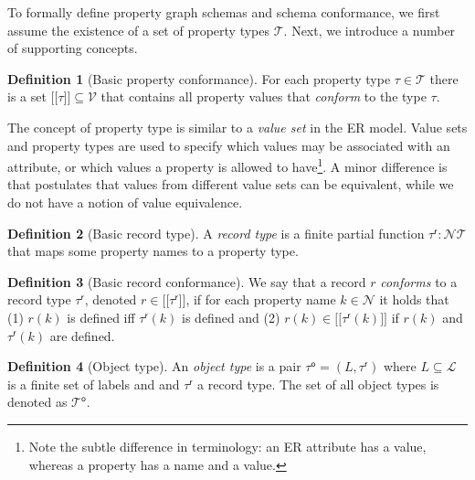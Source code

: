 \documentclass{report}
\makeatletter
\theoremstyle{definition}
\newtheorem{definition}{Definition}
\newcommand{\pto}{}%
\DeclareRobustCommand{\pto}{\mathrel{\mathpalette\p@to@gets\to}}
\newcommand{\p@to@gets}[2]{%
  \ooalign{\hidewidth$\m@th#1\mapstochar\mkern5mu$\hidewidth\cr$\m@th#1\to$\cr}%
}
\newcommand{\ptype}{\tau}
\newcommand{\ptypes}{\mathcal{T}}
\newcommand{\rtype}{\tau^\mathsf{r}}
\newcommand{\otype}{\tau^\mathsf{o}}
\newcommand{\otypes}{\mathcal{T}^\mathsf{o}}
\newcommand{\lsem}{\ensuremath{[\![}}
\newcommand{\rsem}{\ensuremath{]\!]}}
\newcommand{\sem}[1]{\ensuremath{\lsem #1 \rsem}}
\makeatother
\begin{document}
To formally define property graph schemas and schema conformance, we first assume the existence of a set of property types $\mathcal{T}$. Next, we introduce a number of supporting concepts.

\begin{definition}[Basic property conformance]
  \label{def:property-conformance-basic}
  For each property type $\ptype \in \ptypes$ there is a set $\sem{\ptype} \subseteq \mathcal{V}$ that contains all property values that \emph{conform} to the type $\ptype$.
\end{definition}

The concept of property type is similar to a \emph{value set} in the ER model. Value sets and property types are used to specify which values may be associated with an attribute, or which values a property is allowed to have\footnote{Note the subtle difference in terminology: an ER attribute has a value, whereas a property has a name and a value.}. A minor difference is that \citet{chen1976entity} postulates that values from different value sets can be equivalent, while we do not have a notion of value equivalence.

\begin{definition}[Basic record type]
  \label{def:record-type-basic}
  A \emph{record type} is a finite partial function $\rtype : \mathcal{N} \pto \ptypes$ that maps some property names to a property type.
\end{definition}

\begin{definition}[Basic record conformance]
  \label{def:record-conformance-basic}
  We say that a record $r$ \emph{conforms} to a record type $\rtype$, denoted $r \in \sem{\rtype}$, if for each property name $k \in \mathcal{N}$ it holds that (1) $r(k)$ is defined iff $\rtype(k)$ is defined and (2) $r(k) \in \sem{\rtype(k)}$ if $r(k)$ and $\rtype(k)$ are defined.
\end{definition}

\begin{definition}[Object type]
  \label{def:object-type}
  An \emph{object type} is a pair $\otype = (L, \rtype)$ where $L \subseteq \mathcal{L}$ is a finite set of labels and and $\rtype$ a record type.
  The set of all object types is denoted as $\otypes$.
\end{definition}
\end{document}
